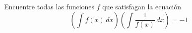 \item Encuentre todas las funciones $f$ que satisfagan la ecuación
    \[ \left(\int f(x) \, dx\right) \left(\int \frac{1}{f(x)} \, dx\right) = -1 \]
